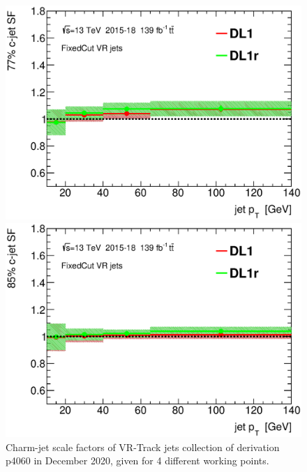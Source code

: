 \documentclass[letterpaper,12pt]{article}
\begin{document}
\begin{figure}[H]
\begin{minipage}[b]{.45\textwidth}
\includegraphics[width=1\textwidth]{SFplots_december/DL1allVRJetsDec_DL1rallVRJetsDec/SF77.eps}
\end{minipage}\hfill
\begin{minipage}[b]{.45\textwidth}
\centering
\includegraphics[width=1\textwidth]{SFplots_december/DL1allVRJetsDec_DL1rallVRJetsDec/SF85.eps}
\end{minipage}
\caption{Charm-jet scale factors of VR-Track jets collection of derivation 
p4060 in December 2020, given for 4 different working points.} \label{fig:Dec_SF_VRJets}
\end{figure}


\end{document}
